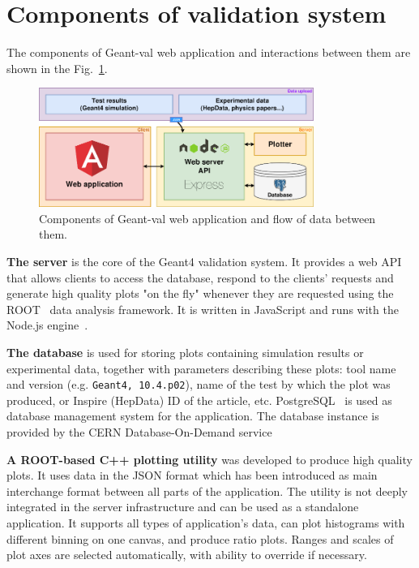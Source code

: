 \section{Components of validation system}
\label{sec-webapplication}

The components of \textsf{Geant-val} web application and interactions between them are shown in the Fig.~\ref{fig:dataflow}.

\begin{figure}[h]
    \centering
    \includegraphics[width=0.8\textwidth,clip]{schema.png}
    \caption{Components of \textsf{Geant-val} web application and flow of data between them.}
    \label{fig:dataflow}
\end{figure}

\textbf{The server} is the core of the Geant4 validation system. It provides a web API that allows clients to access the database, respond to the clients' requests and generate high quality plots "on the fly" whenever they are requested using the ROOT~\cite{ROOT} data analysis framework.
It is written in JavaScript and runs with the Node.js engine~\cite{NodeJS}. 

\textbf{The database} is used for storing plots containing simulation results or experimental data, together with parameters describing these plots: tool name and version (e.g. \texttt{Geant4, 10.4.p02}), name of the test by which the plot was produced, or Inspire (HepData) ID of the article, etc. PostgreSQL~\cite{Postgre} is used as database management system for the application. The database instance is provided by the CERN Database-On-Demand service  %


\textbf{A ROOT-based C++ plotting utility} was developed to produce high quality plots. It uses data in the JSON format which has been introduced as main interchange format between all parts of the application. The utility is not deeply integrated in the server infrastructure and can be used as a standalone application. It supports all types of application's data, can plot histograms with different binning on one canvas, and produce ratio plots. Ranges and scales of plot axes are selected automatically, with ability to override if necessary. %

